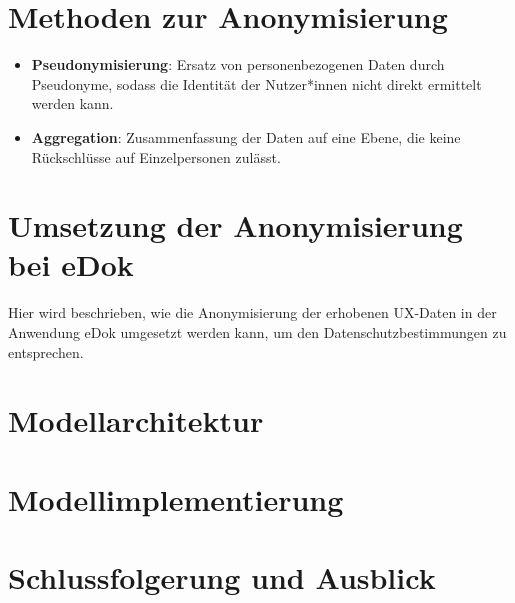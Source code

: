 \documentclass[12pt,oneside]{article}
\begin{document}
\section{Methoden zur Anonymisierung}
\begin{itemize}
\item \textbf{Pseudonymisierung}: Ersatz von personenbezogenen Daten durch Pseudonyme, sodass die Identität der Nutzer*innen nicht direkt ermittelt werden kann.
\item \textbf{Aggregation}: Zusammenfassung der Daten auf eine Ebene, die keine Rückschlüsse auf Einzelpersonen zulässt.
\end{itemize}
\section{Umsetzung der Anonymisierung bei eDok}
Hier wird beschrieben, wie die Anonymisierung der erhobenen UX-Daten in der Anwendung eDok umgesetzt werden kann, um den Datenschutzbestimmungen zu entsprechen.
\section{Modellarchitektur}
 
\section{Modellimplementierung}
 
\section{Schlussfolgerung und Ausblick}
 
 
 
  
\printbibliography
 
\end{document}
